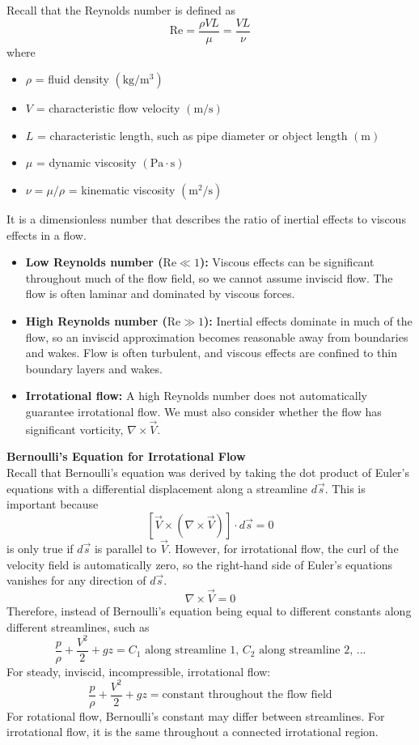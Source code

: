 ﻿\documentclass[12pt]{article}
\begin{document}
\begin{notebox}
Recall that the Reynolds number is defined as
\[
\mathrm{Re}=\frac{\rho VL}{\mu}=\frac{VL}{\nu}
\]
where
\begin{itemize}
    \item $\rho$ = fluid density $(\mathrm{kg/m^3})$
    \item $V$ = characteristic flow velocity $(\mathrm{m/s})$
    \item $L$ = characteristic length, such as pipe diameter or object length $(\mathrm{m})$
    \item $\mu$ = dynamic viscosity $(\mathrm{Pa\cdot s})$
    \item $\nu=\mu/\rho$ = kinematic viscosity $(\mathrm{m^2/s})$
\end{itemize}
It is a dimensionless number that describes the ratio of inertial effects to viscous effects in a flow.
\begin{itemize}
    \item \textbf{Low Reynolds number ($\mathrm{Re} \ll 1$):} Viscous effects can be significant throughout much of the flow field, so we cannot assume inviscid flow. The flow is often laminar and dominated by viscous forces.
    \item \textbf{High Reynolds number ($\mathrm{Re} \gg 1$):} Inertial effects dominate in much of the flow, so an inviscid approximation becomes reasonable away from boundaries and wakes. Flow is often turbulent, and viscous effects are confined to thin boundary layers and wakes.
    \item \textbf{Irrotational flow:} A high Reynolds number does not automatically guarantee irrotational flow. We must also consider whether the flow has significant vorticity, $\nabla \times \vec{V}$.
\end{itemize}
\end{notebox}
\textbf{Bernoulli's Equation for Irrotational Flow}\\
Recall that Bernoulli's equation was derived by taking the dot product of Euler's equations with a differential displacement along a streamline $d\vec s$. This is important because
\[
[\vec V\times(\nabla\times\vec V)]\cdot d\vec s=0
\]
is only true if $d\vec s$ is parallel to $\vec V$. However, for irrotational flow, the curl of the velocity field is automatically zero, so the right-hand side of Euler's equations vanishes for any direction of $d\vec s$. 
\[
\nabla\times\vec V=0
\]
Therefore, instead of Bernoulli's equation being equal to different constants along different streamlines, such as 
\[
\frac{p}{\rho}+\frac{V^2}{2}+gz=\text{$C_1$ along streamline 1, $C_2$ along streamline 2, ...}
\]
For steady, inviscid, incompressible, irrotational flow:
\[
\boxed{\frac{p}{\rho}+\frac{V^2}{2}+gz=\text{constant throughout the flow field}}
\]
For rotational flow, Bernoulli's constant may differ between streamlines. For irrotational flow, it is the same throughout a connected irrotational region.
\end{document}
